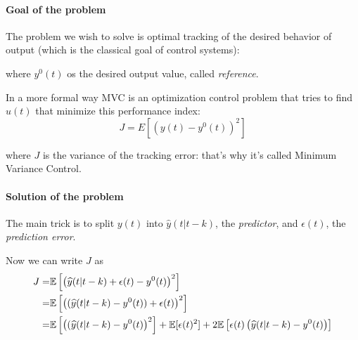 \paragraph{Goal of the problem} 
The problem we wish to solve is optimal tracking of the desired behavior of output (which is the classical goal of control systems):
\begin{figure}[H]
    \centering
\end{figure}
where $y^0(t)$ os the desired output value, called \emph{reference}. 

In a more formal way MVC is an optimization control problem that tries to find $u(t)$ that minimize this performance index:
\[
    J = E\left[ (y(t) - y^0(t))^2 \right]
\]

where $J$ is the variance of the tracking error: that's why it's called Minimum Variance Control.

\paragraph{Solution of the problem}
The main trick is to split $y(t)$ into $\hat{y}(t|t-k)$, the \emph{predictor}, and $\epsilon(t)$, the \emph{prediction error}.

Now we can write $J$ as 
\begin{align*}
	J =& \mathbb{E} \left[ \left( \widehat{y}(t|t-k) + \epsilon(t) - y^0(t) \right)^2 \right] \\
	  =& \mathbb{E} \left[ \left( (\widehat{y}(t|t-k) - y^0(t)) + \epsilon(t) \right)^2 \right] \\
	  =& \mathbb{E} \left[ \left( (\widehat{y}(t|t-k) - y^0(t) \right)^2 \right] + \mathbb{E} [\epsilon(t)^2 ] + 2 \mathbb{E} \left[ \epsilon(t) \left( \widehat{y}(t|t-k) - y^0(t) \right) \right] 
\end{align*}

